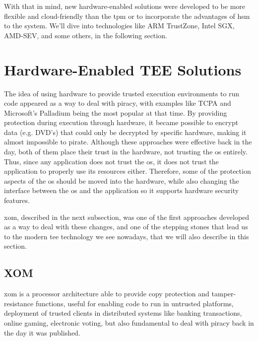 With that in mind, new hardware-enabled solutions were developed to be more flexible and cloud-friendly than the \gls{tpm} or to incorporate the advantages of \gls{hsm} to the system. We'll dive into technologies like ARM TrustZone, Intel SGX, AMD-SEV, and some others, in the following section.




\section{Hardware-Enabled TEE Solutions}
\label{sec:hardwareTEEs}

The idea of using hardware to provide trusted execution environments to run code appeared as a way to deal with piracy, with examples like TCPA \cite{tcpaPaper} and Microsoft's Palladium \cite{microsoftPalladium} being the most popular at that time. By providing protection during execution through hardware, it became possible to encrypt data (e.g. DVD's) that could only be decrypted by specific hardware, making it almost impossible to pirate. 
Although these approaches were effective back in the day, both of them place their trust in the hardware, not trusting the \gls{os} entirely. 
Thus, since any application does not trust the \gls{os}, it does not trust the application to properly use its resources either. Therefore, some of the protection aspects of the \gls{os} should be moved into the hardware, while also changing the interface between the \gls{os} and the application so it supports hardware security features. 

\gls{xom}, described in the next subsection, was one of the first approaches developed as a way to deal with these changes, and one of the stepping stones that lead us to the modern \gls{tee} technology we see nowadays, that we will also describe in this section.

\subsection{XOM}
\label{ssec:xom}

\gls{xom} \cite{xomPaper} is a processor architecture able to provide copy protection and tamper-resistance functions, 
useful for enabling code to run in untrusted platforms, deployment of trusted clients in distributed systems like banking transactions, online gaming, electronic voting, but also fundamental to deal with piracy back in the day it was published. 

